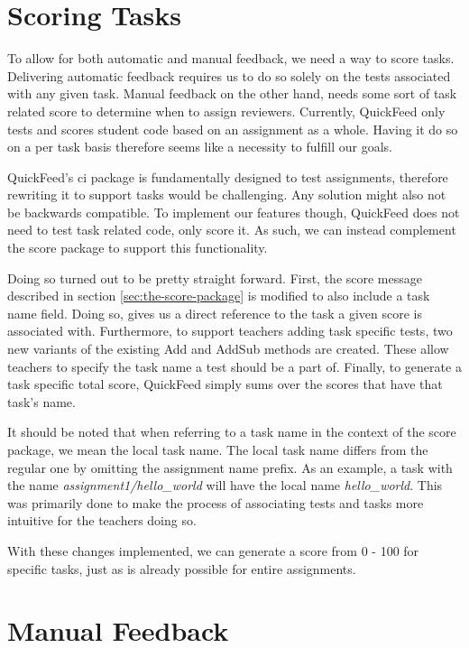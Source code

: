 \section{Scoring Tasks}

To allow for both automatic and manual feedback, we need a way to score tasks.
Delivering automatic feedback requires us to do so solely on the tests associated with any given task.
Manual feedback on the other hand, needs some sort of task related score to determine when to assign reviewers.
Currently, QuickFeed only tests and scores student code based on an assignment as a whole.
Having it do so on a per task basis therefore seems like a necessity to fulfill our goals.

QuickFeed's ci package is fundamentally designed to test assignments, therefore rewriting it to support tasks would be challenging.
Any solution might also not be backwards compatible.
To implement our features though, QuickFeed does not need to test task related code, only score it.
As such, we can instead complement the score package to support this functionality.

Doing so turned out to be pretty straight forward.
First, the score message described in section \ref{sec:the-score-package} is modified to also include a task name field.
Doing so, gives us a direct reference to the task a given score is associated with.
Furthermore, to support teachers adding task specific tests, two new variants of the existing Add and AddSub methods are created.
These allow teachers to specify the task name a test should be a part of.
Finally, to generate a task specific total score, QuickFeed simply sums over the scores that have that task's name.

It should be noted that when referring to a task name in the context of the score package, we mean the local task name.
The local task name differs from the regular one by omitting the assignment name prefix.
As an example, a task with the name \textit{assignment1/hello\_world} will have the local name \textit{hello\_world}.
This was primarily done to make the process of associating tests and tasks more intuitive for the teachers doing so.

With these changes implemented, we can generate a score from 0 - 100 for specific tasks, just as is already possible for entire assignments.

\section{Manual Feedback}

